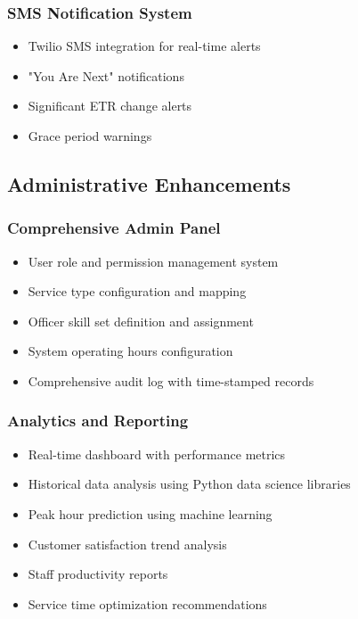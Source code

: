 \documentclass[12pt,a4paper]{report}
\begin{document}
\subsubsection{SMS Notification System}
\begin{itemize}
    \item Twilio SMS integration for real-time alerts
    \item "You Are Next" notifications
    \item Significant ETR change alerts
    \item Grace period warnings
\end{itemize}

\subsection{Administrative Enhancements}

\subsubsection{Comprehensive Admin Panel}
\begin{itemize}
    \item User role and permission management system
    \item Service type configuration and mapping
    \item Officer skill set definition and assignment
    \item System operating hours configuration
    \item Comprehensive audit log with time-stamped records
\end{itemize}

\subsubsection{Analytics and Reporting}
\begin{itemize}
    \item Real-time dashboard with performance metrics
    \item Historical data analysis using Python data science libraries
    \item Peak hour prediction using machine learning
    \item Customer satisfaction trend analysis
    \item Staff productivity reports
    \item Service time optimization recommendations
\end{itemize}
\end{document}
